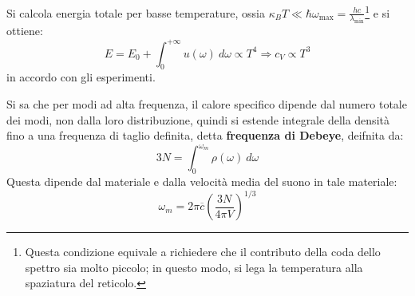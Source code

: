 \documentclass[10pt, a4paper]{scrartcl}
\numberwithin{equation}{subsection}
\theoremstyle{style1}
\begin{document}
Si calcola energia totale per basse temperature, ossia $\kappa _B T \ll \hbar \omega_\text{max} = \frac{hc}{\lambda _\text{min}}$\footnote{Questa condizione equivale a richiedere che il contributo della coda dello spettro sia molto piccolo; in questo modo, si lega la temperatura alla spaziatura del reticolo.} e si ottiene:
\begin{equation}
	E = E_0 + \int_{0} ^{+\infty} u(\omega) \ d\omega \propto T^4 \Rightarrow c_V \propto T^3
\end{equation}
in accordo con gli esperimenti.

Si sa che per modi ad alta frequenza, il calore specifico dipende dal numero totale dei modi, non dalla loro distribuzione, 
quindi si estende integrale della densit\`a fino a una frequenza di taglio definita, detta \textbf{frequenza di Debeye}, deifnita da:
\begin{equation}
	3N = \int_{0} ^{\omega_m}  \rho (\omega) \ d\omega
\end{equation}
Questa dipende dal materiale e dalla velocit\`a media del suono in tale materiale:
\begin{equation}
	\omega_m = 2\pi \overline{c } \left(\frac{3N}{4\pi V}\right) ^{ 1 / 3} 
\end{equation}
\end{document}
